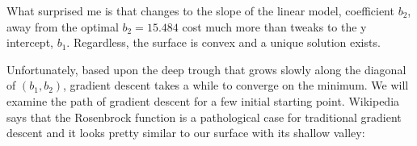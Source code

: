 \begin{fullwidth}
\noindent {}

What surprised me is that changes to the slope of the linear model, coefficient $b_2$, away from the optimal $b_2=15.484$ cost much more than tweaks to the y intercept, $b_1$. Regardless, the surface is convex and a unique solution exists. 

Unfortunately, based upon the deep trough that grows slowly along the diagonal of $(b_1,b_2)$, gradient descent takes a while to converge on the minimum. We will examine the path of gradient descent for a few initial starting point. Wikipedia says that the Rosenbrock function is a pathological case for traditional gradient descent and it looks pretty similar to our surface with its shallow valley:


\end{fullwidth}
